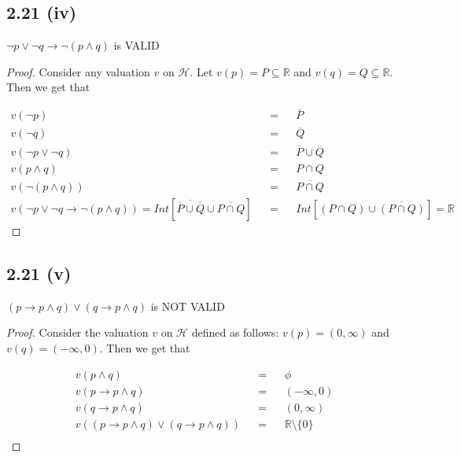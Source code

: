 \documentclass[12pt]{article}
\begin{document}
\subsection*{2.21 (iv)} 
$\neg p \vee \neg q \rightarrow \neg (p \wedge q)$ is VALID

\begin{proof}
Consider any valuation $v$ on $\mathcal{H}$. Let $v(p) = P \subseteq \mathbb{R}$ and $v(q) = Q \subseteq \mathbb{R}$. Then we get that

\begin{align*}
    v(\neg p) && = && \overline{P} \\
    v(\neg q) && = && \overline{Q} \\
    v(\neg p \vee \neg q) && = && \overline{P} \cup \overline{Q} \\
    v(p \wedge q) && = && P \cap Q \\
    v(\neg (p \wedge q)) && = && \overline{P \cap Q} \\
    v(\neg p \vee \neg q \rightarrow \neg (p \wedge q)) = Int[\overline{\overline{P} \cup \overline{Q}} \cup \overline{P \cap Q}] && = && Int[(P \cap Q) \cup \overline{(P \cap Q)}] = \mathbb{R}
\end{align*}
\end{proof}

\subsection*{2.21 (v)} 
$(p \rightarrow p \wedge q) \vee (q \rightarrow p \wedge q)$ is NOT VALID
\begin{proof}
Consider the valuation $v$ on $\mathcal{H}$ defined as follows: $v(p) = (0, \infty)$ and $v(q) = (-\infty, 0)$. Then we get that

\begin{align*}
    v(p \wedge q) &&=&& \phi \\
    v(p \rightarrow p \wedge q) && = && (-\infty, 0) \\
    v(q \rightarrow p \wedge q) && = && (0, \infty) \\
    v((p \rightarrow p \wedge q) \vee (q \rightarrow p \wedge q)) && = && \mathbb{R} \setminus \{0\} \\
\end{align*}
\end{proof}
\end{document}
